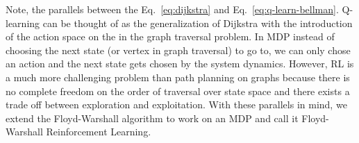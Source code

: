 Note, the parallels between the Eq.~\eqref{eq:dijkstra} and
Eq.~\eqref{eq:q-learn-bellman}. Q-learning can be thought of as the
generalization of Dijkstra with the introduction of the action space on the in
the graph traversal problem. In MDP instead of choosing the next state (or
vertex in graph traversal) to go to, we can only chose an action and the next
state gets chosen by the system dynamics.
However, RL is a much more challenging problem than path planning on graphs
because there is no complete freedom on the order of traversal over state space
and there exists a trade off between exploration and exploitation. With these
parallels in mind, we extend the Floyd-Warshall algorithm to work on an MDP and
call it Floyd-Warshall Reinforcement Learning.


